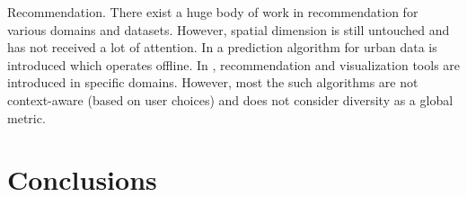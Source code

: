 \documentclass{sig-alternate-05-2015}
\begin{document}
Recommendation. There exist a huge body of work in recommendation
\cite{Adomavicius:2005} for various domains and datasets. However, spatial
dimension is still untouched and has not received a lot of attention. In
\cite{ChirigatiDDF16} a prediction algorithm for urban data is introduced which operates offline. In
\cite{Levandoski:2012,Magdy2014,HendawiKRBTA15a,Bao2015,Magdy:2014},
recommendation and visualization tools are introduced in specific domains.
However, most the such algorithms are not context-aware (based on user choices)
and does not consider diversity as a global metric.    

\section{Conclusions}\label{sec:conclusions}



 
\end{document}

